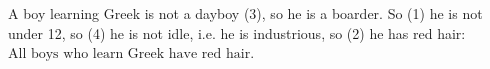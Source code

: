 A boy learning Greek is not a dayboy (3), so he is a boarder. So (1) he is not under 12, so (4) he is not idle, i.e. he is industrious, so (2) he has red hair: $\boxed{\text{All boys who learn Greek have red hair.}}$
